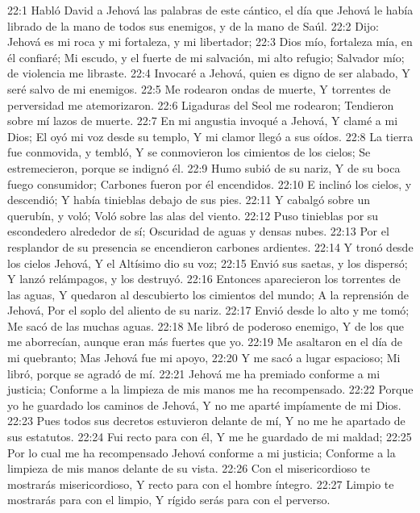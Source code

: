 22:1 Habló David a Jehová las palabras de este cántico, el día que Jehová le había librado de la mano de todos sus enemigos, y de la mano de Saúl.  
22:2 Dijo:  
Jehová es mi roca y mi fortaleza, y mi libertador;  
22:3 Dios mío, fortaleza mía, en él confiaré;  
Mi escudo, y el fuerte de mi salvación, mi alto refugio;  
Salvador mío; de violencia me libraste.  
22:4 Invocaré a Jehová, quien es digno de ser alabado,  
Y seré salvo de mi enemigos.  
22:5 Me rodearon ondas de muerte,  
Y torrentes de perversidad me atemorizaron.  
22:6 Ligaduras del Seol me rodearon;  
Tendieron sobre mí lazos de muerte.  
22:7 En mi angustia invoqué a Jehová,  
Y clamé a mi Dios;  
El oyó mi voz desde su templo,  
Y mi clamor llegó a sus oídos.  
22:8 La tierra fue conmovida, y tembló,  
Y se conmovieron los cimientos de los cielos;  
Se estremecieron, porque se indignó él.  
22:9 Humo subió de su nariz,  
Y de su boca fuego consumidor;  
Carbones fueron por él encendidos.  
22:10 E inclinó los cielos, y descendió;  
Y había tinieblas debajo de sus pies.  
22:11 Y cabalgó sobre un querubín, y voló;  
Voló sobre las alas del viento.  
22:12 Puso tinieblas por su escondedero alrededor de sí;  
Oscuridad de aguas y densas nubes.  
22:13 Por el resplandor de su presencia se encendieron carbones ardientes.  
22:14 Y tronó desde los cielos Jehová,  
Y el Altísimo dio su voz;  
22:15 Envió sus saetas, y los dispersó;  
Y lanzó relámpagos, y los destruyó.  
22:16 Entonces aparecieron los torrentes de las aguas,  
Y quedaron al descubierto los cimientos del mundo;  
A la reprensión de Jehová,  
Por el soplo del aliento de su nariz.  
22:17 Envió desde lo alto y me tomó;  
Me sacó de las muchas aguas.  
22:18 Me libró de poderoso enemigo,  
Y de los que me aborrecían, aunque eran más fuertes que yo.  
22:19 Me asaltaron en el día de mi quebranto;  
Mas Jehová fue mi apoyo,  
22:20 Y me sacó a lugar espacioso;  
Mi libró, porque se agradó de mí.  
22:21 Jehová me ha premiado conforme a mi justicia;  
Conforme a la limpieza de mis manos me ha recompensado.  
22:22 Porque yo he guardado los caminos de Jehová,  
Y no me aparté impíamente de mi Dios.  
22:23 Pues todos sus decretos estuvieron delante de mí,  
Y no me he apartado de sus estatutos.  
22:24 Fui recto para con él,  
Y me he guardado de mi maldad;  
22:25 Por lo cual me ha recompensado Jehová conforme a mi justicia;  
Conforme a la limpieza de mis manos delante de su vista.  
22:26 Con el misericordioso te mostrarás misericordioso,  
Y recto para con el hombre íntegro.  
22:27 Limpio te mostrarás para con el limpio,  
Y rígido serás para con el perverso.  
